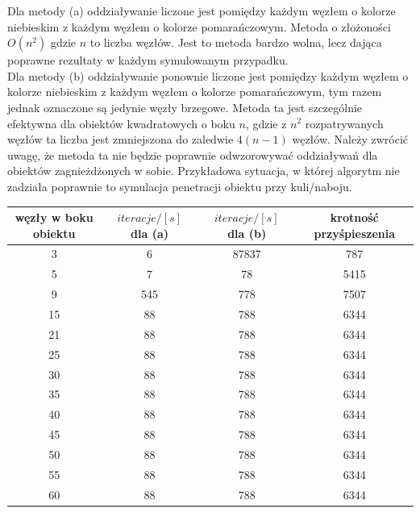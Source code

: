 \documentclass[12pt, letterpaper]{report}
\begin{document}
    Dla metody (a) oddziaływanie liczone jest pomiędzy każdym węzłem o kolorze 
    niebieskim z każdym węzłem o
    kolorze pomarańczowym. Metoda o złożoności $O(n^2)$ gdzie $n$ to liczba węzłów.
    Jest to metoda bardzo wolna, lecz dająca poprawne rezultaty w każdym symulowanym przypadku.\\

    Dla metody (b) oddziaływanie ponownie liczone jest pomiędzy każdym węzłem o kolorze niebieskim z każdym
    węzłem o kolorze pomarańczowym, tym razem jednak oznaczone są jedynie węzły brzegowe.
    Metoda ta jest szczególnie efektywna dla obiektów kwadratowych o boku $n$, gdzie z $n^2$
    rozpatrywanych węzłów ta liczba jest zmniejszona do zaledwie $4(n-1)$ węzłów.
    Należy zwrócić uwagę, że metoda ta nie będzie poprawnie odwzorowywać oddziaływań dla
    obiektów zagnieżdżonych w sobie. Przykładowa sytuacja, w której algorytm nie zadziała poprawnie
    to symulacja penetracji obiektu przy kuli/naboju.

    \begin{center}
        \begin{tabular}{||c c c c||} 
         \hline
         węzły w boku obiektu & $iteracje / [s]$ dla (a) & $iteracje / [s]$ dla (b) & krotność przyśpieszenia \\ [0.5ex] 
         \hline\hline
         3 & 6 & 87837 & 787 \\ 
         \hline
         5 & 7 & 78 & 5415 \\
         \hline
         9 & 545 & 778 & 7507 \\
         \hline
         15 & 88 & 788 & 6344 \\
         \hline
         21 & 88 & 788 & 6344 \\
         \hline
         25 & 88 & 788 & 6344 \\
         \hline
         30 & 88 & 788 & 6344 \\
         \hline
         35 & 88 & 788 & 6344 \\
         \hline
         40 & 88 & 788 & 6344 \\ 
         \hline
         45 & 88 & 788 & 6344 \\ 
         \hline
         50 & 88 & 788 & 6344 \\
         \hline
         55 & 88 & 788 & 6344 \\ 
         \hline
         60 & 88 & 788 & 6344 \\ [1ex] 
         \hline
        \end{tabular}
    \end{center}
\end{document}
